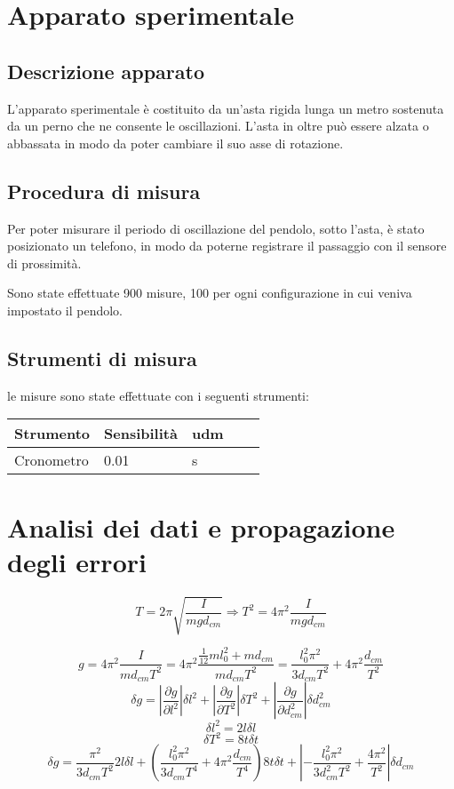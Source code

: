 \documentclass[11pt,a4paper]{article}
\begin{document}
\section{Apparato sperimentale}
\subsection{Descrizione apparato}
L'apparato sperimentale è costituito da un'asta rigida lunga un metro sostenuta da un perno che ne consente le oscillazioni.
L'asta in oltre può essere alzata o abbassata in modo da poter cambiare il suo asse di rotazione.

\subsection{Procedura di misura}
Per poter misurare il periodo di oscillazione del pendolo, sotto l'asta, è stato posizionato un telefono, in modo da poterne registrare il passaggio con il sensore di prossimità.

Sono state effettuate 900 misure, 100 per ogni configurazione in cui veniva impostato il pendolo.

\subsection{Strumenti di misura}
le misure sono state effettuate con i seguenti strumenti:
\begin{longtable}[]{@{}lllll@{}}
\toprule
Strumento & Sensibilità & udm \tabularnewline
\midrule
\endhead
Cronometro & 0.01 & s \tabularnewline
\bottomrule
\end{longtable}
\section{Analisi dei dati e propagazione degli errori}
\begin{equation}
T=2\pi\sqrt{\frac{I}{mgd_{cm}}} \Longrightarrow T^2=4\pi^2\frac{I}{mgd_{cm}} 
\end{equation}

\begin{equation}
    g=4\pi^2\frac{I}{md_{cm}T^2}=4\pi^2\frac{\frac{1}{12}ml_0^2+md_{cm}}{md_{cm}T^2}=\frac{l_0^2\pi^2}{3d_{cm}T^2}+4\pi^2\frac{d_{cm}}{T^2}
\end{equation}
\begin{equation}
\delta g=\left | \frac{\partial g}{\partial l^2} \right | \delta l^2 + \left | \frac{\partial g}{\partial T^2} \right | \delta T^2 + \left | \frac{\partial g}{\partial d_{cm}^2} \right | \delta d_{cm}^2
\end{equation}
\begin{equation}
\delta l^2=2l\delta l
\end{equation}
\begin{equation}
\delta T^2=8t\delta t
\end{equation}
\begin{equation}
\delta g=\frac{\pi^2}{3d_{cm}T^2}2l\delta l + \left (\frac{l_0^2\pi^2}{3d_{cm}T^4} + 4\pi^2\frac{d_{cm}}{T^4}\right )8t\delta t + \left |-\frac{l_0^2\pi^2}{3d_{cm}^2T^2} + \frac{4\pi^2}{T^2}\right |\delta d_{cm}
\end{equation}
\end{document}
